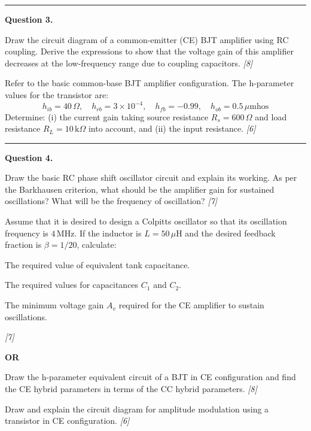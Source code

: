 \documentclass[11pt,a4paper]{article}
\newcommand{\pts}[1]{\hfill   \textit{[#1]}}
\begin{document}
\medskip\rule{\linewidth}{0.2pt}




\noindent   \textbf{Question 3.}

\begin{parts}
  \item Draw the circuit diagram of a common-emitter (CE) BJT amplifier using RC coupling. Derive the expressions to show that the voltage gain of this amplifier decreases at the low-frequency range due to coupling capacitors. \pts{8}
  \item Refer to the basic common-base BJT amplifier configuration. The h-parameter values for the transistor are:
    \[ h_{ib} = 40\,\Omega, \quad h_{rb} = 3  \times 10^{-4}, \quad h_{fb} = -0.99, \quad h_{ob} = 0.5\,\mu \text{mhos} \]
    Determine: (i) the current gain taking source resistance $R_s = 600\,\Omega$ and load resistance $R_L = 10\, \text{k}\Omega$ into account, and (ii) the input resistance. \pts{6}
\end{parts}

\medskip\rule{\linewidth}{0.2pt}




\noindent   \textbf{Question 4.}

\begin{parts}
  \item Draw the basic RC phase shift oscillator circuit and explain its working. As per the Barkhausen criterion, what should be the amplifier gain for sustained oscillations? What will be the frequency of oscillation? \pts{7}
  \item Assume that it is desired to design a Colpitts oscillator so that its oscillation frequency is $4\, \text{MHz}$. If the inductor is $L = 50\,\mu \text{H}$ and the desired feedback fraction is $\beta = 1/20$, calculate:
    
\begin{parts}
      \item The required value of equivalent tank capacitance.
      \item The required values for capacitances $C_1$ and $C_2$.
      \item The minimum voltage gain $A_v$ required for the CE amplifier to sustain oscillations.
    \end{parts} \pts{7}
\end{parts}
\hfill   \textbf{OR}

\begin{parts}
  \item Draw the h-parameter equivalent circuit of a BJT in CE configuration and find the CE hybrid parameters in terms of the CC hybrid parameters. \pts{8}
  \item Draw and explain the circuit diagram for amplitude modulation using a transistor in CE configuration. \pts{6}
\end{parts}
\end{document}

